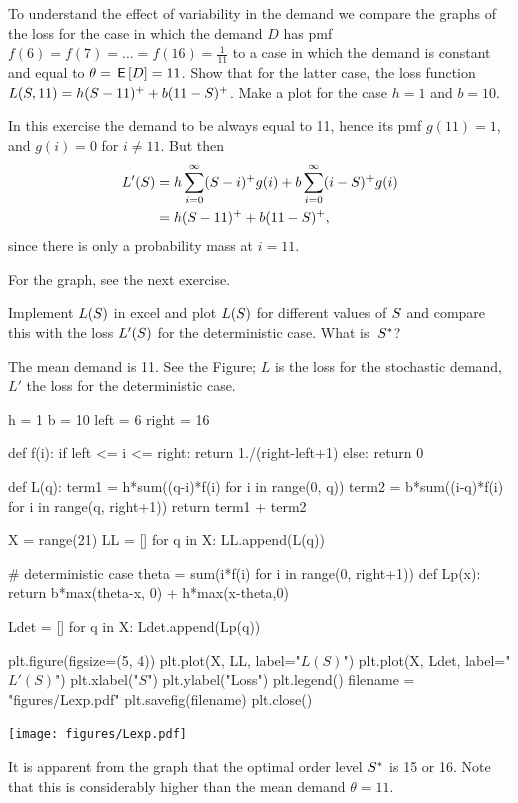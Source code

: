\begin{exercise}\label{ex:10}
To understand the effect of variability in the demand we compare the graphs of the loss for the case in which the  demand  $D$ has pmf $f(6)=f(7)=\ldots=f(16)=\frac{1}{11}$ to a case in which  the demand is constant and equal to $\theta = \,\mathsf{E}\left[D\right] = 11$. Show that for the latter case, the loss function $L(S, 11) = h(S-11)^+ + b(11-S)^+$. Make a plot for the case $h=1$ and $b=10$. 
  \begin{solution}
In this exercise  the demand to be always equal to 11, hence its pmf $g(11) = 1$, and $g(i)=0$ for $i\neq 11$. But then
\begin{align*}
  L'(S) 
&=h\sum_{i=0}^\infty(S-i)^+ g(i) + b\sum_{i=0}^{\infty}(i-S)^+ g(i) \\
&=h(S-11)^+  + b(11- S)^+,
\end{align*}
since there is only a probability mass at $i=11$.

For the graph, see the next exercise.
  \end{solution}
\end{exercise}

\begin{exercise}[Continuation]\label{ex:55}
Implement $L(S)$ in excel and plot $L(S)$ for different values of $S$ and compare this with the loss $L'(S)$ for the deterministic case. What is~$S^*$?
\begin{solution}
The mean demand is 11. See the Figure; $L$ is the loss for the stochastic demand, $L'$ the loss for the deterministic case.

  
\begin{pycode}[news]
h = 1
b = 10
left = 6
right = 16

def f(i):
    if left <= i <= right:
        return 1./(right-left+1)
    else:
        return 0

def L(q):
    term1 = h*sum((q-i)*f(i) for i in range(0, q))
    term2 = b*sum((i-q)*f(i) for i in range(q, right+1))
    return term1 + term2

X = range(21)
LL = []
for q in X:
    LL.append(L(q))

# deterministic case
theta = sum(i*f(i) for i in range(0, right+1))
def Lp(x):
    return b*max(theta-x, 0) + h*max(x-theta,0)

Ldet = []
for q in X:
    Ldet.append(Lp(q))

plt.figure(figsize=(5, 4))
plt.plot(X, LL, label="$L(S)$")
plt.plot(X, Ldet, label="$L'(S)$")
plt.xlabel("$S$")
plt.ylabel("Loss")
plt.legend()
filename = "figures/Lexp.pdf"
plt.savefig(filename)
plt.close()
\end{pycode}

\begin{center}
\texttt{[image: figures/Lexp.pdf]}
\end{center}


It is apparent from the graph that the optimal order level $S^*$ is 15 or 16. Note that this is considerably higher than the mean demand $\theta = 11$. 
\end{solution}
\end{exercise}
 


